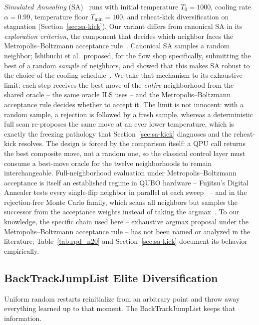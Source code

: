 \documentclass[preprint,12pt,authoryear]{elsarticle}
\begin{document}
\emph{Simulated Annealing} (SA)~\citep{kirkpatrick1983} runs with
initial temperature $T_0 = 1000$, cooling rate $\alpha = 0.99$,
temperature floor $T_{\min} = 100$, and reheat-kick diversification on
stagnation (Section~\ref{sec:sa-kick}). Our variant differs from canonical SA in
its \emph{exploration criterion}, the component that decides which
neighbor faces the Metropolis--Boltzmann acceptance rule~\citep{franzin19}. Canonical SA
samples a random neighbor; Ishibuchi et al.\ proposed, for the flow
shop specifically, submitting the best of a random \emph{sample} of
neighbors, and showed that this makes SA robust to the choice of the
cooling schedule~\citep{ishibuchi95}. We take that mechanism to its
exhaustive limit: each step receives the best move of the
\emph{entire} neighborhood from the shared oracle -- the same oracle
ILS uses -- and the Metropolis--Boltzmann acceptance rule decides whether to accept
it. The limit is not innocent: with a random sample, a rejection is
followed by a fresh sample, whereas a deterministic full scan
re-proposes the same move at an ever lower temperature, which is
exactly the freezing pathology that Section~\ref{sec:sa-kick}
diagnoses and the reheat-kick resolves. The design is forced by the
comparison itself: a QPU call returns the best composite move, not a
random one, so the classical control layer must consume a best-move
oracle for the twelve neighborhoods to remain interchangeable.
Full-neighborhood evaluation under Metropolis--Boltzmann acceptance is
itself an established regime in QUBO hardware -- Fujitsu's Digital
Annealer tests every single-flip neighbor in parallel at each
sweep~\citep{aramon19} -- and in the rejection-free Monte Carlo
family, which scans all neighbors but samples the successor from the
acceptance weights instead of taking the argmax~\citep{rosenthal21}.
To our knowledge, the specific chain used here -- exhaustive argmax
proposal under the Metropolis--Boltzmann acceptance rule -- has not been named or
analyzed in the literature; Table~\ref{tab:rpd_n20} and
Section~\ref{sec:sa-kick} document its behavior empirically.

\subsection{BackTrackJumpList Elite Diversification}
\label{sec:btjl}

Uniform random restarts reinitialize from an arbitrary point and throw
away everything learned up to that moment. The BackTrackJumpList keeps
that information.
\end{document}
